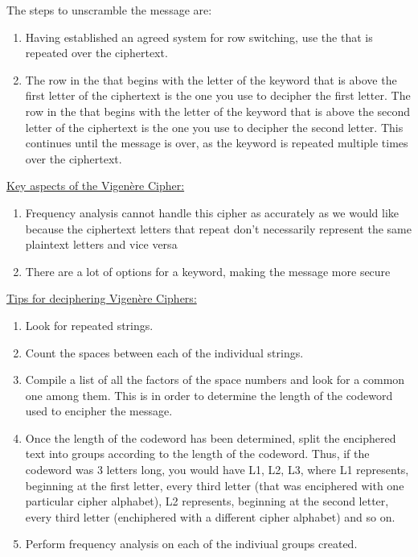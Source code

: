 The steps to unscramble the message are:
\begin{enumerate}
\item Having established an agreed system for row switching, use the  that is repeated over the ciphertext.  
\item The row in the  that begins with the letter of the keyword that is above the first letter of the ciphertext is the one you use to decipher the first letter.  The row in the  that begins with the letter of the keyword that is above the second letter of the ciphertext is the one you use to decipher the second letter.  This continues until the message is over, as the keyword is repeated multiple times over the ciphertext.
\end{enumerate}

\underline{Key aspects of the Vigen\`ere Cipher:}
\begin{enumerate}
\item Frequency analysis cannot handle this cipher as accurately as we would like because the ciphertext letters that repeat don't necessarily represent the same plaintext letters and vice versa
\item There are a lot of options for a keyword, making the message more secure
\end{enumerate}

\underline{Tips for deciphering Vigen\`ere Ciphers:}
\begin{enumerate}
\item Look for repeated strings.
\item Count the spaces between each of the individual strings.
\item Compile a list of all the factors of the space numbers and look for a common one among them.  This is in order to determine the length of the codeword used to encipher the message.
\item Once the length of the codeword has been determined, split the enciphered text into groups according to the length of the codeword.  Thus, if the codeword was 3 letters long, you would have L1, L2, L3, where L1 represents, beginning at the first letter, every third letter (that was enciphered with one particular cipher alphabet), L2 represents, beginning at the second letter, every third letter (enchiphered with a different cipher alphabet) and so on.
\item Perform frequency analysis on each of the indiviual groups created.
\end{enumerate}

